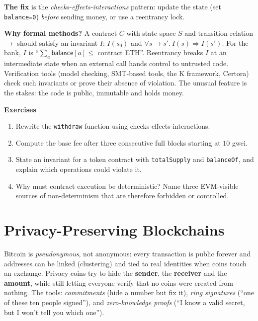 \documentclass[11pt,a4paper]{article}
\newenvironment{plainenglish}{\par\smallskip}{\par\smallskip}
\newenvironment{formal}{\par\smallskip}{\par\smallskip}
\newenvironment{exercisebox}{\par\medskip\noindent\textbf{Exercises}\par\nopagebreak\smallskip}{\par\medskip}
\theoremstyle{definition}
\theoremstyle{plain}
\theoremstyle{remark}
\begin{document}
\textbf{The fix} is the \emph{checks-effects-interactions} pattern: update the state (set \texttt{balance=0}) \emph{before} sending money, or use a reentrancy lock.

\begin{formal}
\textbf{Why formal methods?} A contract $C$ with state space $S$ and transition relation $\to$ should satisfy an invariant $I$: $I(s_0)$ and $\forall s\to s'.\ I(s)\Rightarrow I(s')$. For the bank, $I$ is ``$\sum_a\mathsf{balance}[a]\le$ contract ETH''.
Reentrancy breaks $I$ at an intermediate state when an external call hands control to untrusted code. Verification tools (model checking, SMT-based tools, the K framework, Certora) check such invariants or prove their absence of violation.
The unusual feature is the stakes: the code is public, immutable and holds money.
\end{formal}

\begin{exercisebox}
\begin{enumerate}[nosep]
\item Rewrite the \texttt{withdraw} function using checks-effects-interactions.
\item Compute the base fee after three consecutive full blocks starting at $10$ gwei.
\item State an invariant for a token contract with \texttt{totalSupply} and \texttt{balanceOf}, and explain which operations could violate it.
\item Why must contract execution be deterministic? Name three EVM-visible sources of non-determinism that are therefore forbidden or controlled.
\end{enumerate}
\end{exercisebox}

\section{Privacy-Preserving Blockchains}\label{sec:privacy}

\begin{plainenglish}
Bitcoin is \emph{pseudonymous}, not anonymous: every transaction is public forever and addresses can be linked (clustering) and tied to real identities when coins touch an exchange. Privacy coins try to hide the \textbf{sender}, the \textbf{receiver} and the \textbf{amount}, while still letting everyone verify
that no coins were created from nothing. The tools: \emph{commitments} (hide a number but fix it), \emph{ring signatures} (``one of these ten people signed''), and \emph{zero-knowledge proofs} (``I know a valid secret, but I won't tell you which one'').
\end{plainenglish}
\end{document}
